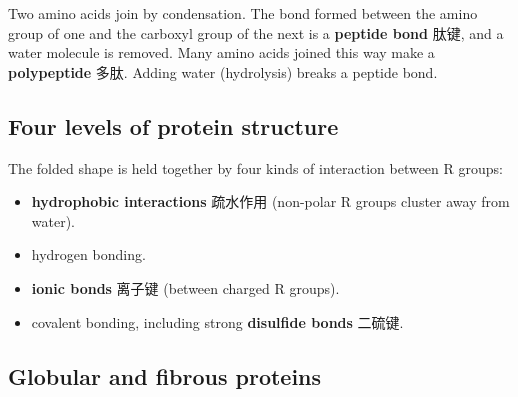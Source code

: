 \documentclass[11pt]{article}
\begin{document}
Two amino acids join by condensation. The bond formed between the amino group of one and the carboxyl group of the next is a \textbf{peptide bond} 肽键, and a water molecule is removed. Many amino acids joined this way make a \textbf{polypeptide} 多肽. Adding water (hydrolysis) breaks a peptide bond.

\subsection*{Four levels of protein structure}

\begin{center}
\end{center}

The folded shape is held together by four kinds of interaction between R groups:

\begin{itemize}
\item \textbf{hydrophobic interactions} 疏水作用 (non-polar R groups cluster away from water).

\item hydrogen bonding.

\item \textbf{ionic bonds} 离子键 (between charged R groups).

\item covalent bonding, including strong \textbf{disulfide bonds} 二硫键.

\end{itemize}

\subsection*{Globular and fibrous proteins}
\end{document}
